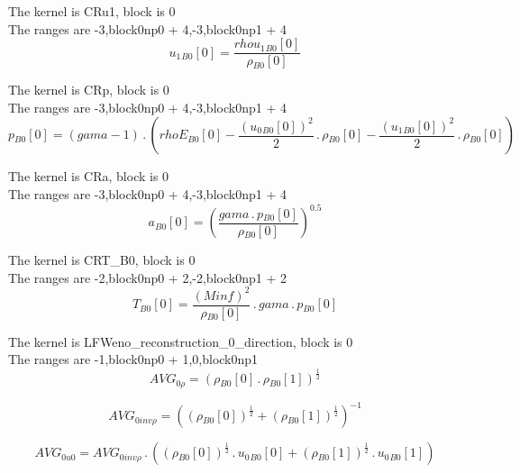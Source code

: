 \documentclass{article}
\begin{document}
\noindent The kernel is CRu1, block is 0\\\noindent The ranges are -3,block0np0 + 4,-3,block0np1 + 4\\\begin{dmath}{u_{1}{_{B0}}}[{0}] = \frac{{rhou_{1}{_{B0}}}[{0}]}{{\rho{_{B0}}}[{0}]}\end{dmath}

\noindent The kernel is CRp, block is 0\\\noindent The ranges are -3,block0np0 + 4,-3,block0np1 + 4\\\begin{dmath}{p{_{B0}}}[{0}] = \left(gama - 1\right) \,.\, \left({rhoE{_{B0}}}[{0}] - \frac{\left({u_{0}{_{B0}}}[{0}] \right)^{2}}{2} \,.\, {\rho{_{B0}}}[{0}] - \frac{\left({u_{1}{_{B0}}}[{0}] \right)^{2}}{2} \,.\, 
{\rho{_{B0}}}[{0}]\right)\end{dmath}

\noindent The kernel is CRa, block is 0\\\noindent The ranges are -3,block0np0 + 4,-3,block0np1 + 4\\\begin{dmath}{a{_{B0}}}[{0}] = \left(\frac{gama \,.\, {p{_{B0}}}[{0}]}{{\rho{_{B0}}}[{0}]} \right)^{0.5}\end{dmath}

\noindent The kernel is CRT_B0, block is 0\\\noindent The ranges are -2,block0np0 + 2,-2,block0np1 + 2\\\begin{dmath}{T{_{B0}}}[{0}] = \frac{\left(Minf \right)^{2}}{{\rho{_{B0}}}[{0}]} \,.\, gama \,.\, {p{_{B0}}}[{0}]\end{dmath}

\noindent The kernel is LFWeno_reconstruction_0_direction, block is 0\\\noindent The ranges are -1,block0np0 + 1,0,block0np1\\\begin{dmath}AVG_{0 \rho} = \left({\rho{_{B0}}}[{0}] \,.\, {\rho{_{B0}}}[{1}] \right)^{\frac{1}{2}}\end{dmath}

\begin{dmath}AVG_{0 inv \rho} = \left(\left({\rho{_{B0}}}[{0}] \right)^{\frac{1}{2}} + \left({\rho{_{B0}}}[{1}] \right)^{\frac{1}{2}} \right)^{-1}\end{dmath}

\begin{dmath}AVG_{0 u0} = AVG_{0 inv \rho} \,.\, \left(\left({\rho{_{B0}}}[{0}] \right)^{\frac{1}{2}} \,.\, {u_{0}{_{B0}}}[{0}] + \left({\rho{_{B0}}}[{1}] \right)^{\frac{1}{2}} \,.\, {u_{0}{_{B0}}}[{1}]\right)\end{dmath}
\end{document}

